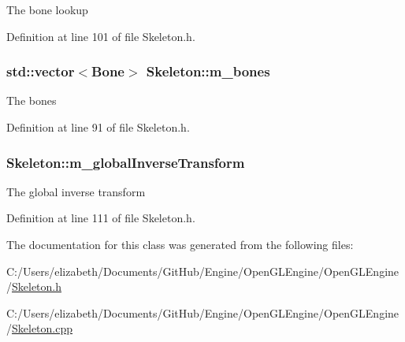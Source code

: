 The bone lookup 



Definition at line 101 of file Skeleton.\+h.

\subsubsection[{\texorpdfstring{m\+\_\+bones}{m_bones}}]{\setlength{\rightskip}{0pt plus 5cm}std\+::vector$<${\bf Bone}$>$ Skeleton\+::m\+\_\+bones\hspace{0.3cm}{\ttfamily [private]}}\hypertarget{class_skeleton_a62748e7093e45f6f7788830afe25e168}{}\label{class_skeleton_a62748e7093e45f6f7788830afe25e168}


The bones 



Definition at line 91 of file Skeleton.\+h.

\subsubsection[{\texorpdfstring{m\+\_\+global\+Inverse\+Transform}{m_globalInverseTransform}}]{ Skeleton\+::m\+\_\+global\+Inverse\+Transform\hspace{0.3cm}{\ttfamily [private]}}\hypertarget{class_skeleton_a0811c767c720f15e9f8419828731c4bf}{}\label{class_skeleton_a0811c767c720f15e9f8419828731c4bf}


The global inverse transform 



Definition at line 111 of file Skeleton.\+h.



The documentation for this class was generated from the following files\+:\begin{DoxyCompactItemize}
\item 
C\+:/\+Users/elizabeth/\+Documents/\+Git\+Hub/\+Engine/\+Open\+G\+L\+Engine/\+Open\+G\+L\+Engine/\hyperlink{_skeleton_8h}{Skeleton.\+h}\item 
C\+:/\+Users/elizabeth/\+Documents/\+Git\+Hub/\+Engine/\+Open\+G\+L\+Engine/\+Open\+G\+L\+Engine/\hyperlink{_skeleton_8cpp}{Skeleton.\+cpp}\end{DoxyCompactItemize}
